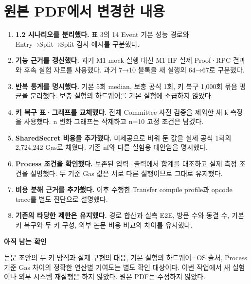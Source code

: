 \section*{원본 PDF에서 변경한 내용}
\begin{enumerate}
    \item \textbf{1.2 시나리오를 분리했다.} 표 3의 14 Event 기본 성능 경로와 Entry→Split→Split 감사 예시를 구분했다.
    \item \textbf{기능 근거를 갱신했다.} 과거 M1 mock 실행 대신 M1-HF 실제 Proof·RPC 결과와 후속 실험 자료를 사용했다. 과거 7→10 블록을 새 실행의 64→67로 구분했다.
    \item \textbf{반복 통계를 명시했다.} 기본 5회 median, 보충 공식 1회, 키 복구 1,000회 묶음 평균을 분리했다. 보충 실험의 하드웨어를 기본 실험에 소급하지 않았다.
    \item \textbf{키 복구 표·그래프를 교체했다.} 전체 Committee 사전 검증을 제외한 새 k 측정을 사용했다. n 변화 그래프는 삭제하고 n=10 고정 조건은 남겼다.
    \item \textbf{SharedSecret 비용을 추가했다.} 미제공으로 비워 둔 값을 실제 공식 1회의 2,724,242 Gas로 채웠다. 기존 nf와 다른 실험용 대안임을 명시했다.
    \item \textbf{Process 조건을 확인했다.} 보존된 입력·출력에서 합계를 대조하고 실제 측정 조건을 설명했다. 두 기준 Gas 값은 서로 다른 실행이므로 그대로 유지했다.
    \item \textbf{비용 분해 근거를 추가했다.} 이후 수행한 Transfer compile profile과 opcode trace를 별도 진단으로 설명했다.
    \item \textbf{기존의 타당한 제한은 유지했다.} 경로 합산과 실측 E2E, 방문 수와 동결 수, 기본 키 복구와 두 키 구성, 외부 논문 비용 비교의 차이를 유지했다.
\end{enumerate}
\textbf{아직 남는 확인}\par
논문 초안의 두 키 방식과 실제 구현의 대응, 기본 실험의 하드웨어·OS 출처, Process 기준 Gas 차이의 정확한 연산별 기여도는 별도 확인 대상이다.
이번 작업에서 새 실험이나 외부 시스템 재실행은 하지 않았다. 원본 PDF는 수정하지 않았다.

